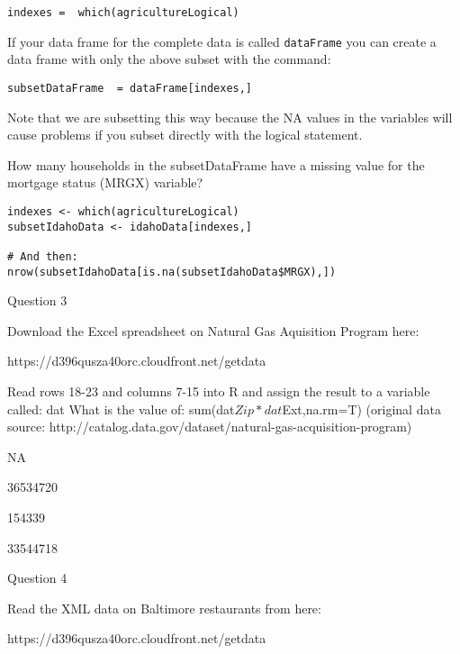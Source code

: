 \documentclass[]{article}
\begin{document}
\begin{framed} \begin{verbatim}
indexes =  which(agricultureLogical) 
\end{verbatim}\end{framed} 

If your data frame for the complete data is called \texttt{dataFrame} you can create a data frame 
with only the above subset with the command: 

\begin{framed} 
\begin{verbatim}
subsetDataFrame  = dataFrame[indexes,] 
\end{verbatim}
\end{framed} 

\noindent Note that we are subsetting this way because the NA values in the variables 
will cause problems if you subset directly with the logical statement. 


\noindent How many households in the subsetDataFrame have a missing value for the mortgage status 
(MRGX) variable?

\begin{framed} 
\begin{verbatim}
indexes <- which(agricultureLogical)
subsetIdahoData <- idahoData[indexes,]

# And then:
nrow(subsetIdahoData[is.na(subsetIdahoData$MRGX),])
\end{verbatim}
\end{framed} 



Question 3
 
Download the Excel spreadsheet on Natural Gas Aquisition Program here: 

https://d396qusza40orc.cloudfront.net/getdata%

Read rows 18-23 and columns 7-15 into R and assign the result to a variable called:  dat  What is the value of:  sum(dat$Zip*dat$Ext,na.rm=T)  (original data source: http://catalog.data.gov/dataset/natural-gas-acquisition-program)
 
NA 

36534720 

154339 

33544718 


Question 4
 
Read the XML data on Baltimore restaurants from here: 

https://d396qusza40orc.cloudfront.net/getdata%
\end{document}

